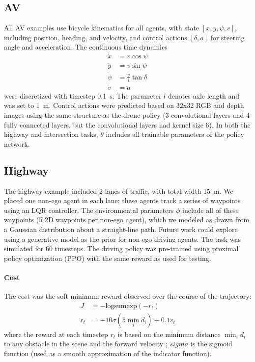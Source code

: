 \subsection{AV}

All AV examples use bicycle kinematics for all agents, with state $[x, y, \psi, v]$, including position, heading, and velocity, and control actions $[\delta, a]$ for steering angle and acceleration. The continuous time dynamics
\begin{align}
    \dot{x}    & = v \cos\psi             \\
    \dot{y}    & = v \sin\psi             \\
    \dot{\psi} & = \frac{v}{l} \tan\delta \\
    \dot{v}    & = a
\end{align}
were discretized with timestep \SI{0.1}{s}. The parameter $l$ denotes axle length and was set to \SI{1}{m}. Control actions were predicted based on 32x32 RGB and depth images using the same structure as the drone policy (3 convolutional layers and 4 fully connected layers, but the convolutional layers had kernel size 6). In both the highway and intersection tasks, $\theta$ includes all trainable parameters of the policy network.

\subsection{Highway}

The highway example included 2 lanes of traffic, with total width \SI{15}{m}. We placed one non-ego agent in each lane; these agents track a series of waypoints using an LQR controller. The environmental parameters $\phi$ include all of these waypoints (5 2D waypoints per non-ego agent), which we modeled as drawn from a Gaussian distribution about a straight-line path. Future work could explore using a generative model as the prior for non-ego driving agents. The task was simulated for 60 timesteps. The driving policy was pre-trained using proximal policy optimization (PPO) with the same reward as used for testing.

\paragraph{Cost} The cost was the soft minimum reward observed over the course of the trajectory:
\begin{align}
    J   & = -\text{logsumexp}(-r_t)            \\
    r_t & = -10 \sigma(5 \min_i d_i) + 0.1 v_t
\end{align}
where the reward at each timestep $r_t$ is based on the minimum distance $\min_i d_i$ to any obstacle in the scene and the forward velocity ; $sigma$ is the sigmoid function (used as a smooth approximation of the indicator function).

